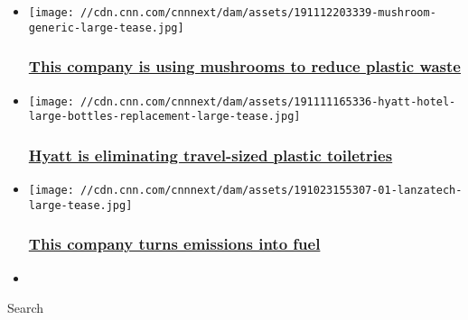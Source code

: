 \begin{itemize}
\item
  \href{/2019/11/13/tech/ecovative-mission-ahead/index.html}{}

  \texttt{[image: //cdn.cnn.com/cnnnext/dam/assets/191112203339-mushroom-generic-large-tease.jpg]}

  \hypertarget{this-company-is-using-mushrooms-to-reduce-plastic-waste}{%
  \subsubsection{\texorpdfstring{\href{/2019/11/13/tech/ecovative-mission-ahead/index.html}{This
  company is using mushrooms to reduce plastic
  waste}}{This company is using mushrooms to reduce plastic waste}}\label{this-company-is-using-mushrooms-to-reduce-plastic-waste}}
\item
  \href{/2019/11/12/business/hyatt-eliminates-plastic-personal-toiletries/index.html}{}

  \texttt{[image: //cdn.cnn.com/cnnnext/dam/assets/191111165336-hyatt-hotel-large-bottles-replacement-large-tease.jpg]}

  \hypertarget{hyatt-is-eliminating-travel-sized-plastic-toiletries}{%
  \subsubsection{\texorpdfstring{\href{/2019/11/12/business/hyatt-eliminates-plastic-personal-toiletries/index.html}{Hyatt
  is eliminating travel-sized plastic
  toiletries}}{Hyatt is eliminating travel-sized plastic toiletries}}\label{hyatt-is-eliminating-travel-sized-plastic-toiletries}}
\item
  \href{/2019/10/30/tech/lanzatech/index.html}{}

  \texttt{[image: //cdn.cnn.com/cnnnext/dam/assets/191023155307-01-lanzatech-large-tease.jpg]}

  \hypertarget{this-company-turns-emissions-into-fuel-}{%
  \subsubsection{\texorpdfstring{\href{/2019/10/30/tech/lanzatech/index.html}{This
  company turns emissions into fuel
  }}{This company turns emissions into fuel }}\label{this-company-turns-emissions-into-fuel-}}
\item
\end{itemize}

Search

